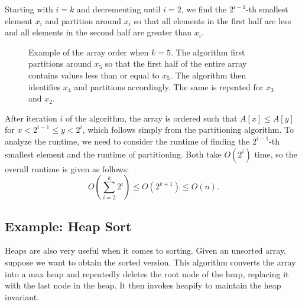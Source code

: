 \documentclass[11pt]{article}
\begin{document}
Starting with $i = k$ and decrementing until $i = 2$, we find the $2^{i-1}$-th smallest element $x_i$ and partition around $x_i$ so that all elements in the first half are less and all elements in the second half are greater than $x_i$. 

\begin{figure}[H]
    \begin{center}
                
    \end{center}
    \caption{Example of the array order when $k = 5$. The algorithm first partitions around $x_5$ so that the first half of the entire array contains values less than or equal to $x_5$. The algorithm then identifies $x_4$ and partitions accordingly. The same is repeated for $x_3$ and $x_2$.}
\end{figure}

After iteration $i$ of the algorithm, the array is ordered such that $A[x] \leq A[y]$ for $x < 2^{i-1} \leq y < 2^i$, which follows simply from the partitioning algorithm. To analyze the runtime, we need to consider the runtime of finding the $2^{i-1}$-th smallest element and the runtime of partitioning. Both take $O(2^i)$ time, so the overall runtime is given as follows:
\begin{equation*}
    O\left(\sum_{i=2}^k 2^i\right) \leq O(2^{k+1}) \leq O(n).
\end{equation*}


\subsection{Example: Heap Sort}
Heaps are also very useful when it comes to sorting. Given an unsorted array, suppose we want to obtain the sorted version. This algorithm converts the array into a max heap and repeatedly deletes the root node of the heap, replacing it with the last node in the heap. It then invokes heapify to maintain the heap invariant. 
\end{document}
